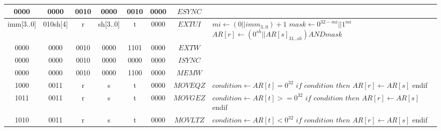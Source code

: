 \begin{longtable}{llllllllllllllllllllllll  p{1cm}  p{6cm} | }
		\multicolumn{4}{|c|}{0000} & \multicolumn{4}{c|}{0000} & \multicolumn{4}{c|}{0010} & \multicolumn{4}{c|}{0000} & \multicolumn{4}{c|}{0010} & \multicolumn{4}{c|}{0000} & \multicolumn{1}{c|}{$ESYNC$} &  \\ \hline
		\multicolumn{4}{|c|}{imm[3..0]} & \multicolumn{4}{c|}{010sh[4]} & \multicolumn{4}{c|}{r} & \multicolumn{4}{c|}{sh[3..0]} & \multicolumn{4}{c|}{t} & \multicolumn{4}{c|}{0000} & \multicolumn{1}{c|}{$EXTUI$} & $mi \leftarrow (0 || imm_{3..0}) + 1$ \newline $mask \leftarrow 0^{32-mi} || 1^{mi}$ \newline $AR[r] \leftarrow (0^{sh} || AR[s]_{31..sh}) AND mask$ \\ \hline
		\multicolumn{4}{|c|}{0000} & \multicolumn{4}{c|}{0000} & \multicolumn{4}{c|}{0010} & \multicolumn{4}{c|}{0000} & \multicolumn{4}{c|}{1101} & \multicolumn{4}{c|}{0000} & \multicolumn{1}{c|}{$EXTW$} &  \\ \hline	
		\multicolumn{4}{|c|}{0000} & \multicolumn{4}{c|}{0000} & \multicolumn{4}{c|}{0010} & \multicolumn{4}{c|}{0000} & \multicolumn{4}{c|}{0000} & \multicolumn{4}{c|}{0000} & \multicolumn{1}{c|}{$ISYNC$} &  \\ \hline
		\multicolumn{4}{|c|}{0000} & \multicolumn{4}{c|}{0000} & \multicolumn{4}{c|}{0010} & \multicolumn{4}{c|}{0000} & \multicolumn{4}{c|}{1100} & \multicolumn{4}{c|}{0000} & \multicolumn{1}{c|}{$MEMW$} &  \\ \hline
		\multicolumn{4}{|c|}{1000} & \multicolumn{4}{c|}{0011} & \multicolumn{4}{c|}{r} & \multicolumn{4}{c|}{s} & \multicolumn{4}{c|}{t} & \multicolumn{4}{c|}{0000} & \multicolumn{1}{c|}{$MOVEQZ$} & $condition \leftarrow AR[t] = 0^{32}$ \newline $if$ $condition$  $then$ \newline $AR[r] \leftarrow AR[s]$ \newline endif \\ \hline
		\multicolumn{4}{|c|}{1011} & \multicolumn{4}{c|}{0011} & \multicolumn{4}{c|}{r} & \multicolumn{4}{c|}{s} & \multicolumn{4}{c|}{t} & \multicolumn{4}{c|}{0000} & \multicolumn{1}{c|}{$MOVGEZ$} & $condition \leftarrow AR[t] >= 0^{32}$ \newline $if$ $condition$  $then$ \newline $AR[r] \leftarrow AR[s]$ \newline endif \\ \hline
		\multicolumn{4}{|c|}{1010} & \multicolumn{4}{c|}{0011} & \multicolumn{4}{c|}{r} & \multicolumn{4}{c|}{s} & \multicolumn{4}{c|}{t} & \multicolumn{4}{c|}{0000} & \multicolumn{1}{c|}{$MOVLTZ$} & $condition \leftarrow AR[t] < 0^{32}$ \newline $if$ $condition$  $then$ \newline $AR[r] \leftarrow AR[s]$ \newline endif \\ \hline

\end{longtable}
